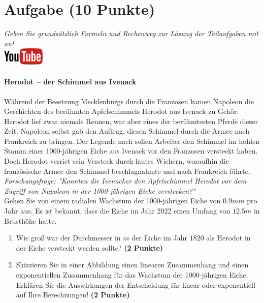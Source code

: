 \documentclass[a4paper, 9pt]{scrartcl}\usepackage[]{graphicx}\usepackage[]{xcolor}
\begin{document}
\section{Aufgabe \hfill (10 Punkte)}

\textit{Geben Sie grunds{\"a}tzlich Formeln und Rechenweg zur L{\"o}sung der
  Teilaufgaben mit an!} \\[1Ex]

\hfill\href{https://youtu.be/Fu8kN0Uj13Y}{\includegraphics[width =
  2cm]{img/youtube}} %
\hspace{2Ex}

\paragraph{Herodot – der Schimmel aus Ivenack}

W{\"a}hrend der Besetzung Mecklenburgs durch die Franzosen kamen Napoleon die
Geschichten des ber{\"u}hmten Apfelschimmels Herodot aus Ivenack zu
Geh{\"o}r. Herodot lief zwar niemals Rennen, war aber eines der ber{\"u}hmtesten
Pferde dieser Zeit. Napoleon selbst gab den Auftrag, diesen
Schimmel durch die Armee nach Frankreich zu bringen. Der Legende nach
sollen Arbeiter den Schimmel im hohlen Stamm einer 1000-j{\"a}hrigen Eiche aus Ivenack vor
den Franzosen versteckt haben. Doch Herodot verriet sein Versteck durch
lautes Wiehern, woraufhin die franz{\"o}sische Armee den Schimmel
beschlagnahmte und nach Frankreich f{\"u}hrte. \\



\textit{Forschungsfrage: "Konnten die Ivenacker den Apfelschimmel Herodot
  vor dem Zugriff von Napoleon in der 1000-j{\"a}hrigen Eiche verstecken?"} \\

Gehen Sie von einem radialen Wachstum der 1000-j{\"a}hrigen Eiche von
$0.9mm$ pro Jahr aus. Es ist bekannt, dass die Eiche im
Jahr 2022 einen Umfang von $12.5m$ in Brusth{\"o}he hatte.

\begin{enumerate}
\item Wie gro{\ss} war der Durchmesser in $m$ der Eiche im Jahr $1820$ als
  Herodot in der Eiche versteckt werden sollte?
  \textbf{(2 Punkte)}
\item Skizzieren Sie in einer Abbildung einen linearen Zusammenhang und einen
exponentiellen Zusammenhang f{\"u}r das Wachstum der 1000-j{\"a}hrigen Eiche. Erkl{\"a}ren Sie die
Auswirkungen der Entscheidung f{\"u}r linear oder exponentiell auf Ihre
Berechnungen! \textbf{(2 Punkte)}
\end{enumerate}
 
\end{document}
